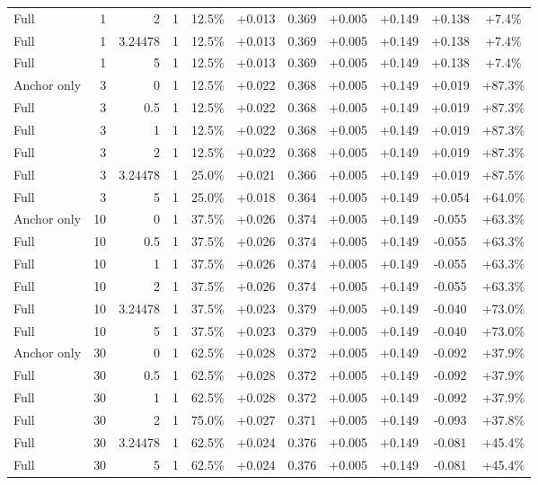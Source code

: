\begin{table}[htbp]
\begin{tabular}{lrrrccccccc}
Full & 1 & 2 & 1 & 12.5\% & +0.013 & 0.369 & +0.005 & +0.149 & +0.138 & +7.4\% \\
Full & 1 & 3.24478 & 1 & 12.5\% & +0.013 & 0.369 & +0.005 & +0.149 & +0.138 & +7.4\% \\
Full & 1 & 5 & 1 & 12.5\% & +0.013 & 0.369 & +0.005 & +0.149 & +0.138 & +7.4\% \\
Anchor only & 3 & 0 & 1 & 12.5\% & +0.022 & 0.368 & +0.005 & +0.149 & +0.019 & +87.3\% \\
Full & 3 & 0.5 & 1 & 12.5\% & +0.022 & 0.368 & +0.005 & +0.149 & +0.019 & +87.3\% \\
Full & 3 & 1 & 1 & 12.5\% & +0.022 & 0.368 & +0.005 & +0.149 & +0.019 & +87.3\% \\
Full & 3 & 2 & 1 & 12.5\% & +0.022 & 0.368 & +0.005 & +0.149 & +0.019 & +87.3\% \\
Full & 3 & 3.24478 & 1 & 25.0\% & +0.021 & 0.366 & +0.005 & +0.149 & +0.019 & +87.5\% \\
Full & 3 & 5 & 1 & 25.0\% & +0.018 & 0.364 & +0.005 & +0.149 & +0.054 & +64.0\% \\
Anchor only & 10 & 0 & 1 & 37.5\% & +0.026 & 0.374 & +0.005 & +0.149 & -0.055 & +63.3\% \\
Full & 10 & 0.5 & 1 & 37.5\% & +0.026 & 0.374 & +0.005 & +0.149 & -0.055 & +63.3\% \\
Full & 10 & 1 & 1 & 37.5\% & +0.026 & 0.374 & +0.005 & +0.149 & -0.055 & +63.3\% \\
Full & 10 & 2 & 1 & 37.5\% & +0.026 & 0.374 & +0.005 & +0.149 & -0.055 & +63.3\% \\
Full & 10 & 3.24478 & 1 & 37.5\% & +0.023 & 0.379 & +0.005 & +0.149 & -0.040 & +73.0\% \\
Full & 10 & 5 & 1 & 37.5\% & +0.023 & 0.379 & +0.005 & +0.149 & -0.040 & +73.0\% \\
Anchor only & 30 & 0 & 1 & 62.5\% & +0.028 & 0.372 & +0.005 & +0.149 & -0.092 & +37.9\% \\
Full & 30 & 0.5 & 1 & 62.5\% & +0.028 & 0.372 & +0.005 & +0.149 & -0.092 & +37.9\% \\
Full & 30 & 1 & 1 & 62.5\% & +0.028 & 0.372 & +0.005 & +0.149 & -0.092 & +37.9\% \\
Full & 30 & 2 & 1 & 75.0\% & +0.027 & 0.371 & +0.005 & +0.149 & -0.093 & +37.8\% \\
Full & 30 & 3.24478 & 1 & 62.5\% & +0.024 & 0.376 & +0.005 & +0.149 & -0.081 & +45.4\% \\
Full & 30 & 5 & 1 & 62.5\% & +0.024 & 0.376 & +0.005 & +0.149 & -0.081 & +45.4\% \\

\end{tabular}
\end{table}
